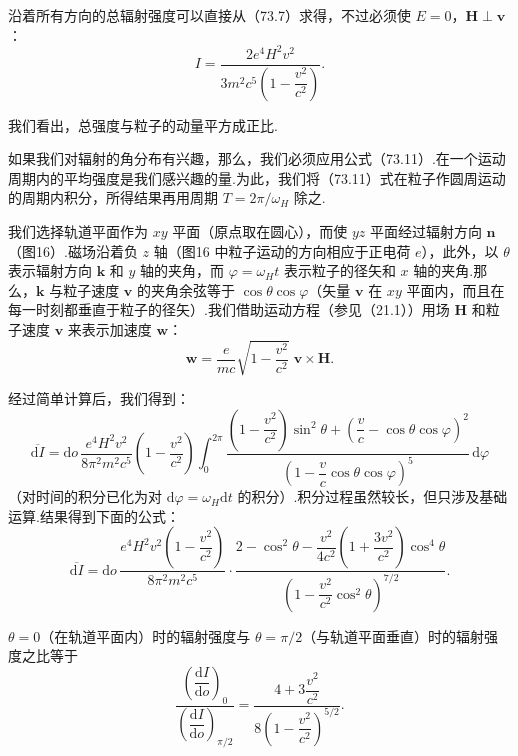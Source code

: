 沿着所有方向的总辐射强度可以直接从（73.7）求得，不过必须使 $E=0$，$\boldsymbol{H}\perp\boldsymbol{v}$：
\begin{equation}
  I=\frac{2e^4H^2v^2}{3m^2c^5\left(1-\dfrac{v^2}{c^2}\right)}.
\end{equation}

我们看出，总强度与粒子的动量平方成正比.

如果我们对辐射的角分布有兴趣，那么，我们必须应用公式（73.11）.在一个运动周期内的平均强度是我们感兴趣的量.为此，我们将（73.11）式在粒子作圆周运动的周期内积分，所得结果再用周期 $T=2\pi/\omega_H$ 除之.

我们选择轨道平面作为 $xy$ 平面（原点取在圆心），而使 $yz$ 平面经过辐射方向 $\boldsymbol{n}$（图16）.磁场沿着负 $z$ 轴（图16 中粒子运动的方向相应于正电荷 $e$），此外，以 $\theta$ 表示辐射方向 $\boldsymbol{k}$ 和 $y$ 轴的夹角，而 $\varphi=\omega_H t$ 表示粒子的径矢和 $x$ 轴的夹角.那么，$\boldsymbol{k}$ 与粒子速度 $\boldsymbol{v}$ 的夹角余弦等于 $\cos\theta\cos\varphi$（矢量 $\boldsymbol{v}$ 在 $xy$ 平面内，而且在每一时刻都垂直于粒子的径矢）.我们借助运动方程（参见（21.1））用场 $\boldsymbol{H}$ 和粒子速度 $\boldsymbol{v}$ 来表示加速度 $\boldsymbol{w}$：
\begin{equation*}
  \boldsymbol{w}=\frac{e}{mc}\sqrt{1-\frac{v^2}{c^2}}\;\boldsymbol{v}\times\boldsymbol{H}.
\end{equation*}

经过简单计算后，我们得到：
\begin{equation}
  \overline{\mathrm{d}I}=\mathrm{d}o\,\frac{e^4H^2v^2}{8\pi^2m^2c^5}
  \left(1-\frac{v^2}{c^2}\right)\int_0^{2\pi}
  \frac{\left(1-\dfrac{v^2}{c^2}\right)\sin^2\theta
  +\left(\dfrac{v}{c}-\cos\theta\cos\varphi\right)^{\!2}}
  {\left(1-\dfrac{v}{c}\cos\theta\cos\varphi\right)^{5}}\,\mathrm{d}\varphi
\end{equation}
（对时间的积分已化为对 $\mathrm{d}\varphi=\omega_H\mathrm{d}t$ 的积分）.积分过程虽然较长，但只涉及基础运算.结果得到下面的公式：
\begin{equation}
  \overline{\mathrm{d}I}=\mathrm{d}o\,\frac{e^4H^2v^2\left(1-\dfrac{v^2}{c^2}\right)}{8\pi^2m^2c^5}
  \cdot\frac{2-\cos^2\theta-\dfrac{v^2}{4c^2}\left(1+\dfrac{3v^2}{c^2}\right)\cos^4\theta}
  {\left(1-\dfrac{v^2}{c^2}\cos^2\theta\right)^{7/2}}.
\end{equation}

$\theta=0$（在轨道平面内）时的辐射强度与 $\theta=\pi/2$（与轨道平面垂直）时的辐射强度之比等于
\begin{equation}
  \frac{\left(\dfrac{\mathrm{d}I}{\mathrm{d}o}\right)_{\!0}}
  {\left(\dfrac{\mathrm{d}I}{\mathrm{d}o}\right)_{\!\pi/2}}
  =\frac{4+3\dfrac{v^2}{c^2}}{8\left(1-\dfrac{v^2}{c^2}\right)^{5/2}}.
\end{equation}

